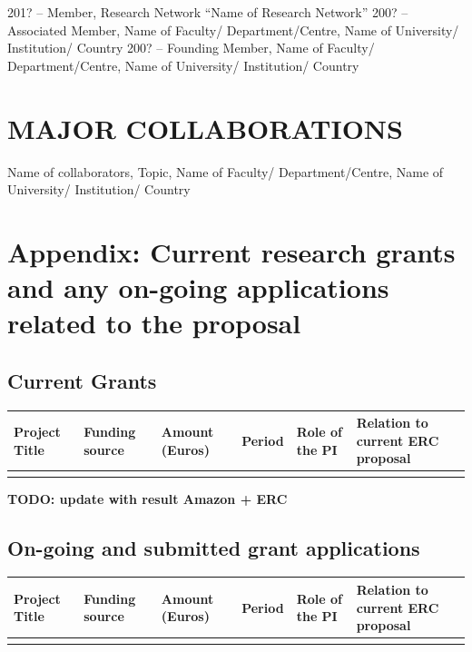 \documentclass[11pt]{report}
\newcommand{\TODO}[1]{{\color{red}\textbf{TODO: #1}}}
\begin{document}
201? –	Member, Research Network “Name of Research Network”
200? –	Associated Member, Name of Faculty/ Department/Centre, Name of University/ Institution/ Country
200? –	Founding Member, Name of Faculty/ Department/Centre, Name of University/ Institution/ Country 

\section{MAJOR COLLABORATIONS}

Name of collaborators, Topic, Name of Faculty/ Department/Centre, Name of University/ Institution/ Country


\newpage

\section{Appendix: Current research grants and any on-going applications related
to the proposal}

\subsection{Current Grants}

\begin{tabular}{@{}llllll@{}}
\toprule
\textbf{Project Title} & \textbf{Funding source} & \textbf{Amount (Euros)} & \textbf{Period} & \textbf{Role of the PI} & \textbf{Relation to current  ERC proposal} \\ \midrule
                       &                         &                         &                 &                         &                                            \\ \bottomrule
\end{tabular}

\TODO{update with result Amazon + ERC}

\subsection{On-going and submitted grant applications}

\begin{tabular}{@{}llllll@{}}
\toprule
\textbf{Project Title} & \textbf{Funding source} & \textbf{Amount (Euros)} & \textbf{Period} & \textbf{Role of the PI} & \textbf{Relation to current  ERC proposal} \\ \midrule
                       &                         &                         &                 &                         &                                            \\ \bottomrule
\end{tabular}
\end{document}
